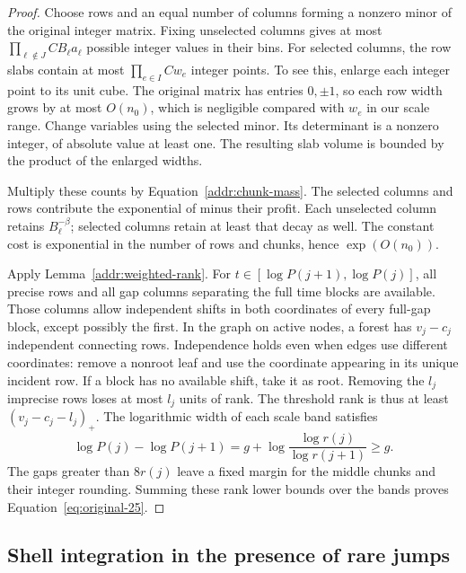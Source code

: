 \begin{proof}
Choose rows and an equal number of columns forming a nonzero minor
of the original integer matrix.  Fixing unselected columns gives
at most $\prod_{\ell\notin J}CB_\ell a_\ell$ possible
integer values in their bins.  For selected columns, the row slabs
contain at most $\prod_{e\in I}Cw_e$ integer points.  To see
this, enlarge each integer point to its unit cube.  The original
matrix has entries $0,\pm1$, so each row width grows by at most
$O(n_0)$, which is negligible compared with $w_e$ in our scale
range.  Change variables using the selected minor.  Its determinant
is a nonzero integer, of absolute value at least one.  The resulting
slab volume is bounded by the product of the enlarged widths.

Multiply these counts by Equation~\eqref{addr:chunk-mass}.
The selected columns and rows contribute the exponential of minus
their profit.  Each unselected column retains $B_\ell^{-\beta}$;
selected columns retain at least that decay as well.  The constant
cost is exponential in the number of rows and chunks, hence
$\exp(O(n_0))$.

Apply Lemma~\ref{addr:weighted-rank}.  For
$t\in[\log P(j+1),\log P(j)]$, all precise rows and all
gap columns separating the full time blocks are available.  Those
columns allow independent shifts in both coordinates of every
full-gap block, except possibly the first.  In the graph on active
nodes, a forest has $v_j-c_j$ independent connecting rows.
Independence holds even when edges use different coordinates:
remove a nonroot leaf and use the coordinate appearing in its
unique incident row.  If a block has no available shift, take it
as root.  Removing the $l_j$ imprecise rows loses at most $l_j$
units of rank.  The threshold rank is thus at least
$(v_j-c_j-l_j)_+$.  The logarithmic width of each scale band satisfies
\[
 \log P(j)-\log P(j+1)
   =g+\log\frac{\log r(j)}{\log r(j+1)}\ge g.
\]
The gaps greater than $8r(j)$ leave a fixed margin for the middle
chunks and their integer rounding.  Summing these rank lower bounds
over the bands proves Equation~\eqref{eq:original-25}.
\end{proof}

\subsection{Shell integration in the presence of rare jumps}

